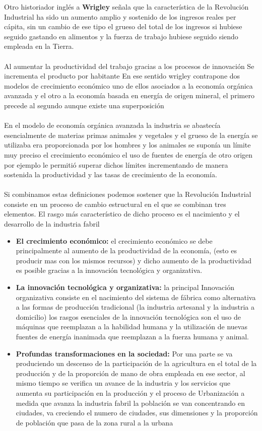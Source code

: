 \documentclass[12pt]{book}
\begin{document}
Otro historiador inglés a \textbf{Wrigley} señala que la característica de la Revolución Industrial ha sido un aumento amplio y sostenido de los ingresos reales per cápita, sin un cambio de ese tipo el grueso del total de los ingresos si hubiese seguido gastando en alimentos y la fuerza de trabajo hubiese seguido siendo empleada en la Tierra.
\\
\\
Al aumentar la productividad del trabajo gracias a los procesos de innovación Se incrementa el producto por habitante En ese sentido wrigley contrapone dos modelos de crecimiento económico uno de ellos asociados a la economía orgánica avanzada y el otro a la economía basada en energía de origen mineral, el primero precede al segundo aunque existe una superposición 
\\
\\
En el modelo de economía orgánica avanzada la industria se abastecía esencialmente de materias primas animales y vegetales y el grueso de la energía se utilizaba era proporcionada por los hombres y los animales se suponía un límite muy preciso el crecimiento económico el uso de fuentes de energía de otro origen por ejemplo le permitió superar dichos límites incrementando de manera sostenida la productividad y las tasas de crecimiento de la economía.
\\
\\
Si combinamos estas definiciones podemos sostener que la Revolución Industrial consiste en un proceso de cambio estructural en el que se combinan tres elementos.
El rasgo más característico de dicho proceso es el nacimiento y el desarrollo de la industria fabril 

\begin{itemize}
\item \textbf{El crecimiento económico: }el crecimiento económico se debe principalmente al aumento de la productividad de la economía, (esto es producir mas con los mismos recursos) y dicho aumento de la productividad es posible gracias a la innovación tecnológica y organizativa.
\item \textbf{La innovación tecnológica y organizativa: }la principal Innovación organizativa consiste en el nacimiento del sistema de fábrica como alternativa a las formas de producción tradicional (la industria artesanal y la industria a domicilio) los rasgos esenciales de la innovación tecnológica son el uso de máquinas que reemplazan a la habilidad humana y la utilización de nuevas fuentes de energía inanimada que reemplazan a la fuerza humana y animal.
\item \textbf{Profundas transformaciones en la sociedad: }Por una parte se va produciendo un descenso de la participación de la agricultura en el total de la producción y de la proporción de mano de obra empleada en ese sector, al mismo tiempo se verifica un avance de la industria y los servicios que aumenta su participación en la producci\'on y el proceso de Urbanización a medida que avanza la industria fabril la población se van concentrando en ciudades, va creciendo el numero de ciudades, sus dimensiones y la proporción de población que pasa de la zona rural a la urbana
\end{itemize}
\end{document}
